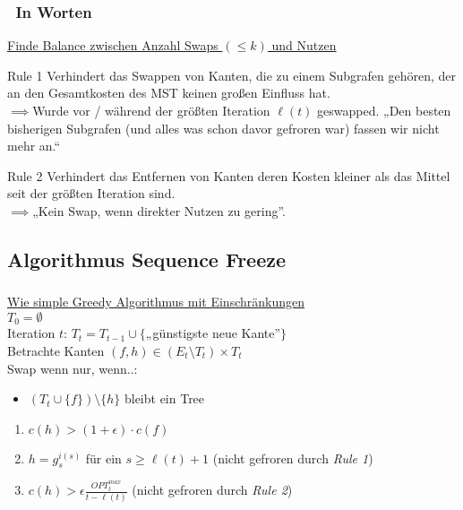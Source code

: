 \begin{frame}
    \frametitle{\insertsubsection~In Worten}
    \underline{Finde Balance zwischen Anzahl Swaps $(\leq k)$ und Nutzen}\\
    \vspace{1em}
    \begin{block}{Rule 1}
        Verhindert das Swappen von Kanten, die zu einem Subgrafen gehören, der an den Gesamtkosten des MST keinen großen Einfluss hat.\\
        $\implies$Wurde vor / während der größten Iteration $\ell(t)$ geswapped. „Den besten bisherigen Subgrafen (und alles was schon davor gefroren war) fassen wir nicht mehr an.“
    \end{block}
    \vspace{1em}
    \begin{block}{Rule 2}
        Verhindert das Entfernen von Kanten deren Kosten kleiner als das Mittel seit der größten Iteration sind.\\
        $\implies$„Kein Swap, wenn direkter Nutzen zu gering”.
    \end{block}
\end{frame}


\subsection{Algorithmus Sequence Freeze}
\begin{frame}
    \frametitle{\insertsubsection}
    \underline{Wie simple Greedy Algorithmus mit Einschränkungen}\\
    \vspace{1em}
    $T_0 = \emptyset$\\
    \vspace{1em}
    Iteration $t$: $T_t = T_{t-1} \cup \{$„günstigste neue Kante”$\}$\\
    \vspace{1em}
    Betrachte Kanten $(f, h) \in (E_t \setminus T_t) \times T_t$\\
    Swap wenn nur, wenn..:
    \vspace{1em}
    \begin{itemize}
        \itemsep\setlength{1em}
        \item $(T_t \cup \{f\}) \setminus \{h\}$ bleibt ein Tree
    \end{itemize}
    \begin{enumerate}
        \itemsep\setlength{1em}
        \item $c(h) > (1+\epsilon) \cdot c(f)$
        \item $h = g_s^{i(s)}$ für ein $s \geq \ell(t) + 1$ (nicht gefroren durch \emph{Rule 1})
        \item $c(h) > \epsilon\frac{OPT_t^{max}}{t-\ell(t)}$ (nicht gefroren durch \emph{Rule 2})
    \end{enumerate}
\end{frame}

